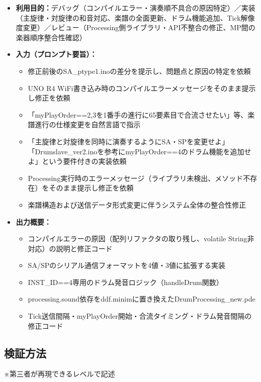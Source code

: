 \documentclass[uplatex,dvipdfmx]{jlreq}
\begin{document}
\begin{itemize}
    \item \textbf{利用目的：}デバッグ（コンパイルエラー・演奏順不具合の原因特定）／実装（主旋律・対旋律の和音対応、楽譜の全面更新、ドラム機能追加、Tick解像度変更）／レビュー（Processing側ライブラリ・API不整合の修正、MP間の楽器順序整合性確認）
    \item \textbf{入力（プロンプト要旨）：}
    \begin{itemize}
        \item 修正前後のSA\_ptype1.inoの差分を提示し、問題点と原因の特定を依頼
        \item UNO R4 WiFi書き込み時のコンパイルエラーメッセージをそのまま提示し修正を依頼
        \item 「myPlayOrder==2,3を1番手の進行に65要素目で合流させたい」等、楽譜進行の仕様変更を自然言語で指示
        \item 「主旋律と対旋律を同時に演奏するようにSA・SPを変更せよ」「Drumslave\_ver2.inoを参考にmyPlayOrder==4のドラム機能を追加せよ」という要件付きの実装依頼
        \item Processing実行時のエラーメッセージ（ライブラリ未検出、メソッド不存在）をそのまま提示し修正を依頼
        \item 楽譜構造および送信データ形式変更に伴うシステム全体の整合性修正
    \end{itemize}
    \item \textbf{出力概要：}
    \begin{itemize}
        \item コンパイルエラーの原因（配列リファクタの取り残し、volatile String非対応）の説明と修正コード
        \item SA/SPのシリアル通信フォーマットを4値・3値に拡張する実装
        \item INST\_ID==4専用のドラム発音ロジック（handleDrum関数）
        \item processing.sound依存をddf.minimに置き換えたDrumProcessing\_new.pde
        \item Tick送信間隔・myPlayOrder開始・合流タイミング・ドラム発音間隔の修正コード
    \end{itemize}
\end{itemize}

\subsection{検証方法}

{\small ※第三者が再現できるレベルで記述}
\end{document}
